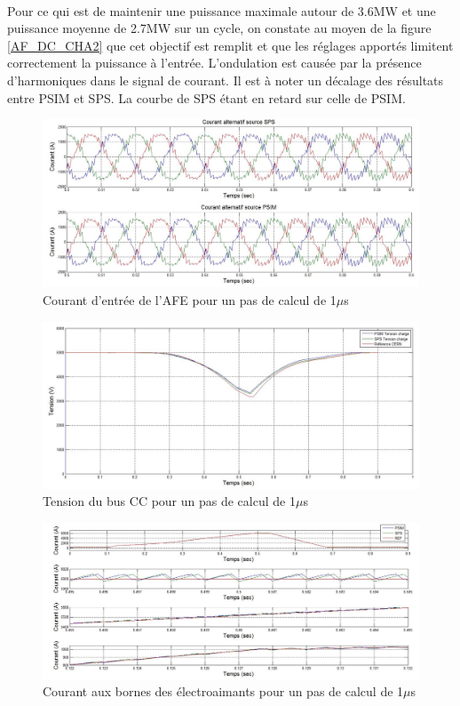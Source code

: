 \paragraph{} Pour ce qui est de maintenir une puissance maximale autour de 3.6MW et une puissance moyenne de 2.7MW sur un cycle, on constate au moyen de la figure \ref{AF_DC_CHA2} que cet objectif est remplit et que les réglages apportés limitent correctement la puissance à l'entrée. L'ondulation est causée par la présence d'harmoniques dans le signal de courant. Il est à noter un décalage des résultats entre PSIM et SPS. La courbe de SPS étant en retard sur celle de PSIM. 

\begin{figure}[htb]
\centering
\includegraphics[scale=0.5]{fig/DCP_AFE/1u/cour_al.jpg}
\caption{Courant d'entrée de l'AFE pour un pas de calcul de 1$\mu$s}
\label{AF_DC_cou1}
\end{figure}


\begin{figure}[htb]
\centering
\includegraphics[scale=0.5]{fig/DCP_AFE/1u/ten_bus.jpg}
\caption{Tension du bus CC pour un pas de calcul de 1$\mu$s}
\label{AF_DC_vch1}
\end{figure}

\begin{figure}[htb]
\centering
\includegraphics[scale=0.5]{fig/DCP_AFE/1u/cour_ch.jpg}
\caption{Courant aux bornes des électroaimants pour un pas de calcul de 1$\mu$s}
\label{AF_DC_CHA1}
\end{figure}

